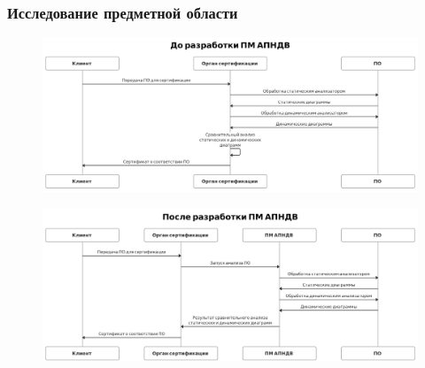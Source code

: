 \begin{frame}[shrink=20]%
\frametitle{Исследование предметной области}
    \vspace{-2ex} 
    \begin{figure}[!htbp]
        \includegraphics[width=\textwidth,height=\textheight,keepaspectratio]{images/uml_before_cropped.png}
    \end{figure}
    \begin{figure}[!htbp]
    \vspace{-2.6ex} 
        \includegraphics[width=\textwidth,height=\textheight,keepaspectratio]{images/uml_after_cropped.png}
    \end{figure}
%

\end{frame}
